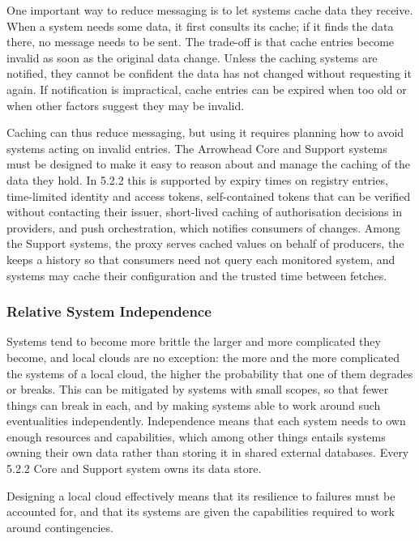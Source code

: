 \documentclass[a4paper]{arrowhead}
\newcommand{\sys}[1]{\textcolor{ArrowheadBlue}{\textbf{\ahbreak{#1}}}}      %
\begin{document}
One important way to reduce messaging is to let systems cache data they receive. When a system
needs some data, it first consults its cache; if it finds the data there, no message needs to be
sent. The trade-off is that cache entries become invalid as soon as the original data change.
Unless the caching systems are notified, they cannot be confident the data has not changed
without requesting it again. If notification is impractical, cache entries can be expired when
too old or when other factors suggest they may be invalid.

Caching can thus reduce messaging, but using it requires planning how to avoid systems acting on
invalid entries. The Arrowhead Core and Support systems must be designed to make it easy to reason
about and manage the caching of the data they hold. In 5.2.2 this is supported by expiry times on
registry entries, time-limited identity and access tokens, self-contained tokens that can be
verified without contacting their issuer, short-lived caching of authorisation decisions in
providers, and push orchestration, which notifies consumers of changes. Among the Support systems,
the \sys{DataManager} proxy serves cached values on behalf of producers, the \sys{SysMonitor} keeps a
history so that consumers need not query each monitored system, and systems may cache their
configuration and the trusted time between fetches.

\subsubsection{Relative System Independence}
Systems tend to become more brittle the larger and more complicated they become, and local
clouds are no exception: the more and the more complicated the systems of a local cloud, the
higher the probability that one of them degrades or breaks. This can be mitigated by systems with
small scopes, so that fewer things can break in each, and by making systems able to work around
such eventualities independently. Independence means that each system needs to own enough
resources and capabilities, which among other things entails systems owning their own data
rather than storing it in shared external databases. Every 5.2.2 Core and Support system owns
its data store.

Designing a local cloud effectively means that its resilience to failures must be accounted for,
and that its systems are given the capabilities required to work around contingencies.
\end{document}
